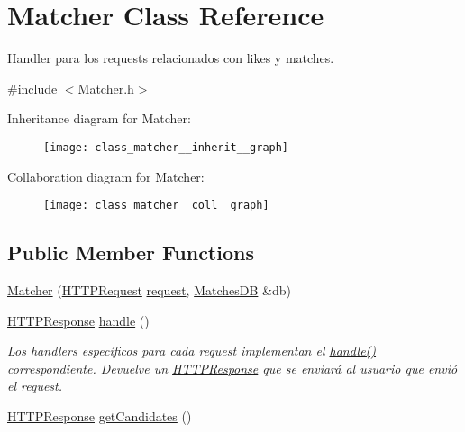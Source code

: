 \hypertarget{class_matcher}{}\section{Matcher Class Reference}
\label{class_matcher}


Handler para los requests relacionados con likes y matches.  




{\ttfamily \#include $<$Matcher.\+h$>$}



Inheritance diagram for Matcher\+:
\nopagebreak
\begin{figure}[H]
\begin{center}
\leavevmode
\texttt{[image: class\_matcher\_\_inherit\_\_graph]}
\end{center}
\end{figure}


Collaboration diagram for Matcher\+:
\nopagebreak
\begin{figure}[H]
\begin{center}
\leavevmode
\texttt{[image: class\_matcher\_\_coll\_\_graph]}
\end{center}
\end{figure}
\subsection*{Public Member Functions}
\begin{DoxyCompactItemize}
\item 
\hyperlink{class_matcher_a09a946e99ca5fb4919719e9a47357cfa}{Matcher} (\hyperlink{class_h_t_t_p_request}{H\+T\+T\+P\+Request} \hyperlink{class_request_handler_a95913fcd2f05853ba9532b7bacd3a044}{request}, \hyperlink{class_matches_d_b}{Matches\+D\+B} \&db)
\item 
\hyperlink{class_h_t_t_p_response}{H\+T\+T\+P\+Response} \hyperlink{class_matcher_aa88fa5bbb00fe8a0a4b6405f8c22ffa3}{handle} ()
\begin{DoxyCompactList}\small\item\em Los handlers específicos para cada request implementan el \hyperlink{class_matcher_aa88fa5bbb00fe8a0a4b6405f8c22ffa3}{handle()} correspondiente. Devuelve un \hyperlink{class_h_t_t_p_response}{H\+T\+T\+P\+Response} que se enviará al usuario que envió el request. \end{DoxyCompactList}\item 
\hyperlink{class_h_t_t_p_response}{H\+T\+T\+P\+Response} \hyperlink{class_matcher_a2d5e1e1705808fcd68d272dc65c12e92}{get\+Candidates} ()
\end{DoxyCompactItemize}
